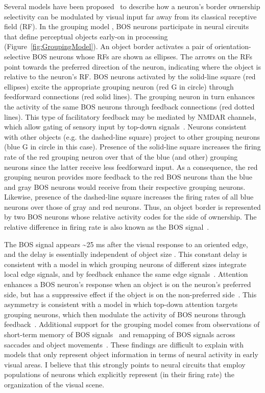 Several models have been proposed~\citep{Zhaoping05, Sakai_Nishimura06,Craft_etal07, Layton_etal12} to describe how a neuron's border ownership selectivity can be modulated by visual input far away from its classical receptive field (RF). In the grouping model
\citep{Craft_etal07}, BOS neurons participate in neural circuits that define perceptual objects early-on in processing (Figure~\ref{fig:GroupingModel}). An object border activates a pair of orientation-selective BOS neurons whose RFs are shown as ellipses. The arrows on the RFs point towards the preferred direction of the neuron, indicating where the object is relative to the neuron's RF. BOS neurons activated by the solid-line square (red ellipses) excite the appropriate grouping neuron (red G in circle) through feedforward connections (red solid lines). The grouping neuron in turn enhances the activity of the same BOS neurons through feedback connections (red dotted lines). This type of facilitatory feedback may be mediated by NMDAR channels, which allow gating of sensory input by top-down signals~\citep{Palmer_etal14}. Neurons consistent with other objects (e.g. the dashed-line square) project to other grouping neurons (blue G in circle in this case). Presence of the solid-line square increases the firing rate of the red grouping neuron over that of the blue (and other) grouping neurons since the latter receive less feedforward input. As a consequence, the red grouping neuron provides more feedback to the red BOS neurons than the blue and gray BOS neurons would receive from their respective grouping neurons. Likewise, presence of the dashed-line square increases the firing rates of all blue neurons over those of gray and red neurons. Thus, an object border is represented by two BOS neurons whose relative activity codes for the side of ownership. The relative difference in firing rate is also known as the BOS signal~\citep{Zhou_etal00}.

The BOS signal appears \textasciitilde 25 ms after the visual response
to an oriented edge, and the delay is essentially independent of object size \citep{Zhou_etal00}. This constant delay is consistent with a model in which grouping neurons of different sizes integrate local edge signals, and by feedback enhance the same edge  signals~\citep{Craft_etal07}. Attention enhances a BOS neuron's response when an object is on the neuron's preferred side, but has a
suppressive effect if the object is on the non-preferred side~\citep{Qiu_etal07}. This asymmetry is consistent with a model in
which top-down attention targets grouping neurons, which then modulate
the activity of BOS neurons through feedback~\citep{Mihalas_etal11b}. Additional support for the grouping model comes from observations of short-term memory of BOS signals~\citep{OHerron_vonderHeydt09} and remapping of BOS signals across saccades and object movements~\citep{OHerron_vonderHeydt13}. These findings are difficult
to explain with models that only represent object information in terms
of neural activity in early visual areas. I believe that this strongly
points to neural circuits that employ populations of neurons which
explicitly represent (\ie in their firing rate) the organization of
the visual scene.

